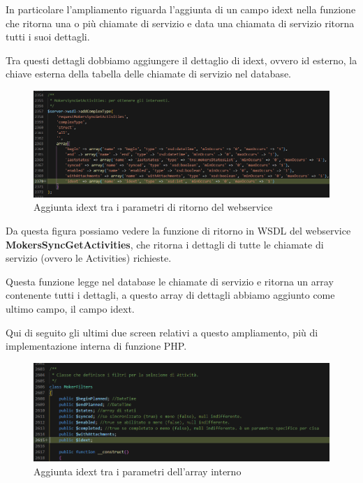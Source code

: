 \newspace
\begin{flushleft}
	In particolare l'ampliamento riguarda l'aggiunta di un campo idext nella funzione che ritorna una o più chiamate di servizio e data una chiamata di servizio ritorna tutti i suoi dettagli.
	
	Tra questi dettagli dobbiamo aggiungere il dettaglio di idext, ovvero id esterno, la chiave esterna della tabella delle chiamate di servizio nel database.
\end{flushleft}
\newspace
\begin{figure}[!h] 
	\centering
	\includegraphics[scale = 0.4]{immagini/webservices/ampliamenti/1ampl_types_changefunction} 
	\caption{Aggiunta idext tra i parametri di ritorno del webservice}
\end{figure}
\newspace
\begin{flushleft}
	Da questa figura possiamo vedere la funzione di ritorno in WSDL del webservice \textbf{MokersSyncGetActivities}, che ritorna i dettagli di tutte le chiamate di servizio (ovvero le Activities) richieste. 
	
	Questa funzione legge nel database le chiamate di servizio e ritorna un array contenente tutti i dettagli, a questo array di dettagli abbiamo aggiunto come ultimo campo, il campo idext.
\end{flushleft}

\newpage

\begin{flushleft}
	Qui di seguito gli ultimi due screen relativi a questo ampliamento, più di implementazione interna di funzione PHP.
\end{flushleft}
\begin{figure}[!h] 
	\centering
	\includegraphics[scale = 0.5]{immagini/webservices/ampliamenti/1ampl_utils_filters.png}
	\caption{Aggiunta idext tra i parametri dell'array interno}
\end{figure}

